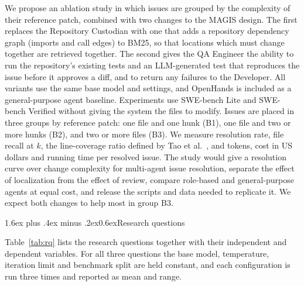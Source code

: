 \documentclass[10pt,a4paper]{article}
\makeatletter
\renewcommand\section{\@startsection{section}{1}{\z@}%
  {1.6ex plus .4ex minus .2ex}{0.6ex}{\normalfont\normalsize\bfseries}}
\makeatother
\begin{document}
We propose an ablation study in which issues are grouped by the complexity of their reference patch, combined with two changes to the MAGIS design. The first replaces the Repository Custodian with one that adds a repository dependency graph (imports and call edges) to BM25, so that locations which must change together are retrieved together. The second gives the QA Engineer the ability to run the repository's existing tests and an LLM-generated test that reproduces the issue before it approves a diff, and to return any failures to the Developer. All variants use the same base model and settings, and OpenHands \cite{wang2025openhands} is included as a general-purpose agent baseline. Experiments use SWE-bench Lite and SWE-bench Verified without giving the system the files to modify. Issues are placed in three groups by reference patch: one file and one hunk (B1), one file and two or more hunks (B2), and two or more files (B3). We measure resolution rate, file recall at $k$, the line-coverage ratio defined by Tao et al.\ \cite[Eq.~1]{tao2024magis}, and tokens, cost in US dollars and running time per resolved issue. The study would give a resolution curve over change complexity for multi-agent issue resolution, separate the effect of localization from the effect of review, compare role-based and general-purpose agents at equal cost, and release the scripts and data needed to replicate it. We expect both changes to help most in group B3.

\section{Research questions}

Table~\ref{tab:rq} lists the research questions together with their independent and dependent variables. For all three questions the base model, temperature, iteration limit and benchmark split are held constant, and each configuration is run three times and reported as mean and range.
\end{document}
